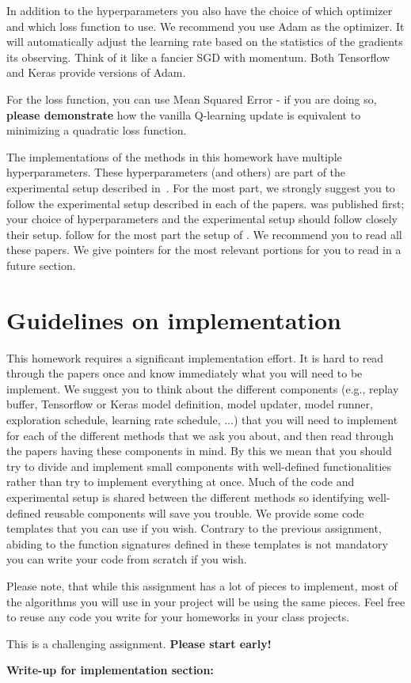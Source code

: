 \documentclass[12pt]{article}
\begin{document}
In addition to the hyperparameters you also have the choice of which
optimizer and which loss function to use. We recommend you use Adam as
the optimizer. It will automatically adjust the learning rate based on
the statistics of the gradients its observing. Think of it like a
fancier SGD with momentum. Both Tensorflow and Keras provide versions
of Adam.

For the loss function, you can use Mean Squared Error - if you are doing so, \textbf{please demonstrate} how the vanilla Q-learning update is equivalent to minimizing a quadratic loss function. 

The implementations of the methods in this homework have multiple
hyperparameters.  These hyperparameters (and others) are part of the
experimental setup described in~\cite{mnih2013playing, mnih2015human}.
For the most part, we strongly suggest you to follow the experimental
setup described in each of the papers.  \cite{mnih2013playing,
  mnih2015human} was published first; your choice of hyperparameters
and the experimental setup should follow closely their setup.
\cite{van2016deep, wang2015dueling} follow for the most part the setup
of \cite{mnih2013playing, mnih2015human}.  We recommend you to read
all these papers.  We give pointers for the most relevant portions for
you to read in a future section.

\section*{Guidelines on implementation}

This homework requires a significant implementation effort. It is hard to read through the papers once and know immediately what you will need to be implement. We suggest you to think about the different components (e.g., replay buffer, Tensorflow or Keras model definition, model updater, model runner,
exploration schedule, learning rate schedule, ...) that you will need to implement for each of the different methods that we ask you about, and then read through the papers having these components in mind. By this we mean that you should try to divide and implement small components with well-defined functionalities rather than try to implement everything at once. Much of the code and experimental setup is shared between the different methods so identifying well-defined reusable components will 
save you trouble. We provide some code templates that you can use if you wish. Contrary to the previous assignment, abiding to the function signatures defined in these templates is not mandatory you can write your code from scratch if you wish. 

Please note, that while this assignment has a lot of pieces to implement, most of the algorithms you will use in your project will be using the same pieces. Feel free to reuse any code you write for your
homeworks in your class projects.


This is a challenging assignment. 
\textbf{Please start early!}


\nocite{*}




\newpage
\textbf{Write-up for implementation section: }
\end{document}
